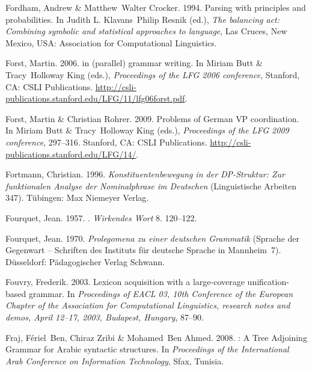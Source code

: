 \begin{thebibliography}{1420}
Fordham, Andrew \& Matthew~Walter Crocker. 1994.
\newblock Parsing with principles and probabilities.
\newblock In Judith L. Klavans~Philip Resnik (ed.), \emph{The balancing act:
  Combining symbolic and statistical approaches to language}, Las Cruces, New
  Mexico, USA: Association for Computational Linguistics.

Forst, Martin. 2006.
 in (parallel) grammar writing.
\newblock In Miriam Butt \& Tracy~Holloway King (eds.), \emph{Proceedings of
  the {LFG 2006} conference}, Stanford, CA: CSLI Publications.
\newblock
  \urlprefix\url{http://csli-publications.stanford.edu/LFG/11/lfg06forst.pdf}.

Forst, Martin \& Christian Rohrer. 2009.
\newblock Problems of {German} {VP} coordination.
\newblock In Miriam Butt \& Tracy~Holloway King (eds.), \emph{Proceedings of
  the {LFG 2009} conference}, 297--316. Stanford, CA: CSLI Publications.
\newblock \urlprefix\url{http://csli-publications.stanford.edu/LFG/14/}.

Fortmann, Christian. 1996.
\newblock \emph{{Konstituentenbewegung in der DP-Struktur: Zur funktionalen
  Analyse der Nominalphrase im Deutschen}} (Linguistische Arbeiten 347).
\newblock T{\"u}bingen: Max Niemeyer Verlag.

Fourquet, Jean. 1957.
.
\newblock \emph{Wirkendes Wort} 8. 120--122.

Fourquet, Jean. 1970.
\newblock \emph{{Prolegomena zu einer deutschen Grammatik}} (Sprache der
  Gegenwart -- Schriften des Instituts f{\"u}r deutsche Sprache in Mannheim~7).
\newblock D{\"u}ssel\-dorf: P{\"a}dagogischer Verlag Schwann.

Fouvry, Frederik. 2003.
\newblock Lexicon acquisition with a large-coverage unification-based grammar.
\newblock In \emph{Proceedings of {EACL 03, 10th Conference of the European
  Chapter of the Association for Computational Linguistics}, research notes and
  demos, {April 12--17, 2003, Budapest, Hungary}}, 87--90.

Fraj, F\'eriel~Ben, Chiraz Zribi \& Mohamed~Ben Ahmed. 2008.
: {A} {Tree Adjoining Grammar} for {Arabic} syntactic
  structures.
\newblock In \emph{Proceedings of the {International Arab Conference on
  Information Technology}}, Sfax, Tunisia.


\end{thebibliography}
